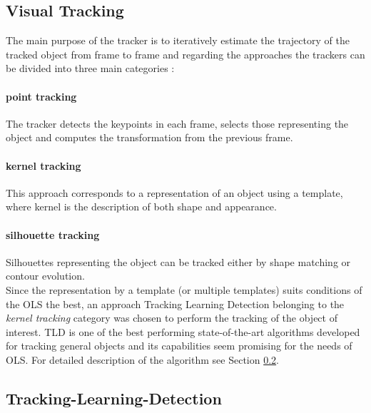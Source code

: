 \subsection{Visual Tracking}

The main purpose of the tracker is to iteratively estimate the trajectory of the tracked object from frame to frame and regarding the approaches the trackers can be divided into three main categories \cite{Yilmaz:2006:OTS:1177352.1177355}:

\paragraph{point tracking} 
The tracker detects the keypoints in each frame, selects those representing the object and computes the transformation from the previous frame.

\paragraph{kernel tracking} 
This approach corresponds to a representation of an object using a template, where kernel is the description of both shape and appearance.

\paragraph{silhouette tracking}
Silhouettes representing the object can be tracked either by shape matching or contour evolution. \\

Since the representation by a template (or multiple templates) suits conditions of the OLS the best, an approach Tracking Learning Detection belonging to the \textit{kernel tracking} category was chosen to perform the tracking of the object of interest. TLD is one of the best performing state-of-the-art algorithms developed for tracking general objects and its capabilities seem promising for the needs of OLS. For detailed description of the algorithm see Section \ref{txt:tracking_learning_detection}.

\subsection{Tracking-Learning-Detection} \label{txt:tracking_learning_detection}

